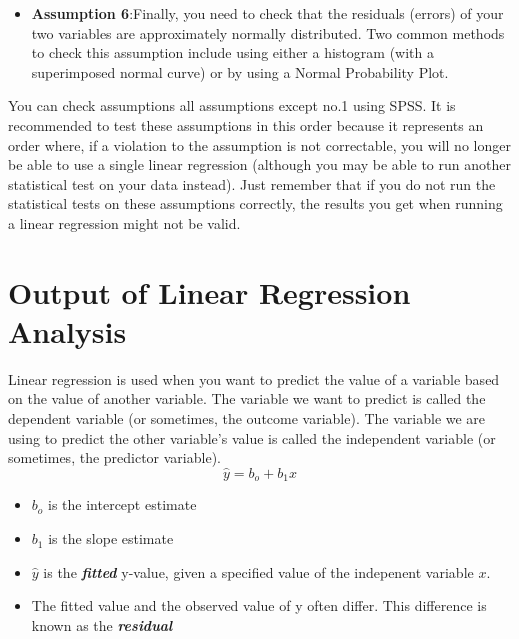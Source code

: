 \documentclass[a4paper,12pt]{article}
\begin{document}
\begin{itemize}

\item \textbf{Assumption 6}:Finally, you need to check that the residuals (errors) of your two variables are approximately normally distributed. Two common methods to check this assumption include using either a histogram (with a superimposed normal curve) or by using a Normal Probability Plot.

\end{itemize}
You can check assumptions all assumptions except no.1 using SPSS. It is recommended to test these assumptions in this order because it represents an order where, if a violation to the assumption is not correctable, you will no longer be able to use a single linear regression (although you may be able to run another statistical test on your data instead). Just remember that if you do not run the statistical tests on these assumptions correctly, the results you get when running a linear regression might not be valid.


\newpage

\section{Output of Linear Regression Analysis}
Linear regression is used when you want to predict the value of a variable based on the value of another variable. The variable we want to predict is called the dependent variable (or sometimes, the outcome variable). The variable we are using to predict the other variable's value is called the independent variable (or sometimes, the predictor variable).
\[ \hat{y} = b_o + b_1 x \]
\begin{itemize}
\item $b_o$ is the intercept estimate
\item $b_1$ is the slope estimate
\item $\hat{y}$ is the \textbf{\textit{fitted}} y-value, given a specified value of the indepenent variable $x$.
\item The fitted value and the observed value of y often differ. This difference is known as the \textbf{\textit{residual}}
\end{itemize}
\end{document}
